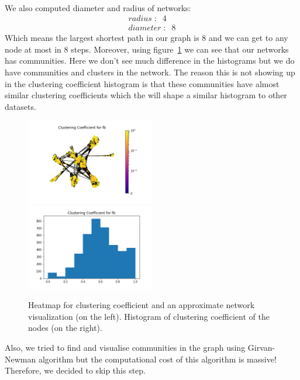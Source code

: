 \documentclass[letterpaper, 11pt]{article}
\newcommand{\1}{\mathds{1}}	%
\theoremstyle{definition}
\begin{document}
\paragraph{}We also computed diameter and radius of networks:
\begin{equation}
\begin{split} 
radius\; :\;\; 4 \\
diameter\;:\;\; 8
\end{split}
\end{equation}
Which means the largest shortest path in our graph is 8 and we can get to any node at most in 8 steps. Moreover, using figure~\ref{fig:fb} we can see that our networks has communities. Here we don't see much difference in the histograms but we do have communities and clusters in the network. The reason this is not showing up in the clustering coefficient histogram is that these communities have almost similar clustering coefficients which the will shape a similar histogram to other datasets.
\begin{figure}[h]
\includegraphics[width=0.5\textwidth]{fb_clustering.png}
\includegraphics[width=0.5\textwidth]{fb_clustering_hist.png}
\captionsetup{justification=centering,margin=0.5cm}
\caption{Heatmap for clustering coefficient and an approximate network visualization (on the left). Histogram of clustering coefficient of the nodes (on the right).}
\label{fig:fb}
\end{figure}
Also, we tried to find and visualise communities in the graph using Girvan-Newman algorithm but the computational cost of this algorithm is massive! Therefore, we decided to skip this step.
\end{document}

